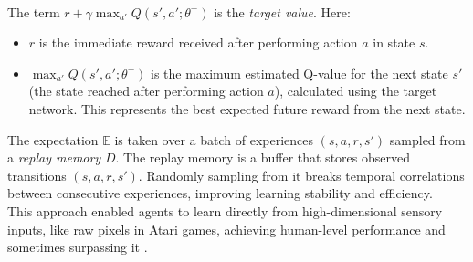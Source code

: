 \\ \noindent
The term $r + \gamma \max_{a'} Q(s', a'; \theta^{-})$ is the \textit{target value}. Here:
\begin{itemize}
    \item $r$ is the immediate reward received after performing action $a$ in state $s$.
    \item $\max_{a'} Q(s', a'; \theta^{-})$ is the maximum estimated Q-value for the next state $s'$ (the state reached after performing action $a$), calculated using the target network. This represents the best expected future reward from the next state.
\end{itemize}
\noindent
The expectation $\mathbb{E}$ is taken over a batch of experiences $(s, a, r, s')$ sampled from a \textit{replay memory} $D$. The replay memory is a buffer that stores observed transitions $(s, a, r, s')$. Randomly sampling from it breaks temporal correlations between consecutive experiences, improving learning stability and efficiency.
\\ \noindent
This approach enabled agents to learn directly from high-dimensional sensory inputs, like raw pixels in Atari games, achieving human-level performance and sometimes surpassing it \cite{Mnih2015}.                          
\\ \noindent
